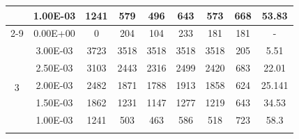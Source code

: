 \begin{table}[H]
{\begin{tabular}{|c|c|c|c|c|c|c|c|c|}
                               & 1.00E-03         & 1241      & 579                                                        & 496                                                       & 643                                                       & 573     & 668    & 53.83                                                              \\ \cline{2-9}
                               & 0.00E+00         & 0         & 204                                                        & 104                                                       & 233                                                       & 181     & 181    & -                                                                  \\ \hline
            \multirow{6}{*}{3} & 3.00E-03         & 3723      & 3518                                                       & 3518                                                      & 3518                                                      & 3518    & 205    & 5.51                                                               \\ \cline{2-9}
                               & 2.50E-03         & 3103      & 2443                                                       & 2316                                                      & 2499                                                      & 2420    & 683    & 22.01                                                              \\ \cline{2-9}
                               & 2.00E-03         & 2482      & 1871                                                       & 1788                                                      & 1913                                                      & 1858    & 624    & 25.141                                                             \\ \cline{2-9}
                               & 1.50E-03         & 1862      & 1231                                                       & 1147                                                      & 1277                                                      & 1219    & 643    & 34.53                                                              \\ \cline{2-9}
                               & 1.00E-03         & 1241      & 503                                                        & 463                                                       & 586                                                       & 518     & 723    & 58.3                                                               \\ \cline{2-9}

\end{tabular}}
\end{table}
